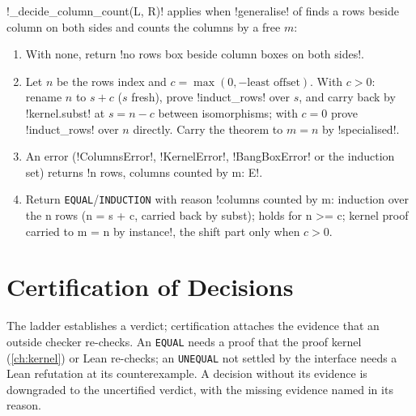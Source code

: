 \begin{algorithm}\label{alg:proofs-columns}
\py!_decide_column_count(L, R)! applies when \py!generalise! of  finds a rows \bbox{} beside column \bboxes{} on both sides and counts the columns by a free $m$:
\begin{enumerate}
\item With none, return \code!no rows box beside column boxes on both sides!.
\item Let $n$ be the rows index and $c=\max(0,-\text{least offset})$. With $c>0$: rename $n$ to $s+c$ ($s$ fresh), prove \py!induct_rows! over $s$, and carry back by \py!kernel.subst! at $s=n-c$ between isomorphisms; with $c=0$ prove \py!induct_rows! over $n$ directly. Carry the theorem to $m=n$ by \py!specialised!.
\item An error (\py!ColumnsError!, \py!KernelError!, \py!BangBoxError! or the induction set) returns \code!n rows, columns counted by m: E!.
\item Return \texttt{EQUAL}/\allowbreak\texttt{INDUCTION} with reason \code!columns counted by m: induction over the n rows (n = s + c, carried back by subst); holds for n >= c; kernel proof carried to m = n by instance!, the shift part only when $c>0$.
\end{enumerate}
\end{algorithm}

\section{Certification of Decisions}\label{sec:proofs-certify}

The ladder establishes a verdict; certification attaches the evidence that an outside checker re-checks. An \texttt{EQUAL} needs a proof that the proof kernel (\cref{ch:kernel}) or Lean re-checks; an \texttt{UNEQUAL} not settled by the interface needs a Lean refutation at its counterexample. A decision without its evidence is downgraded to the uncertified verdict, with the missing evidence named in its reason.

